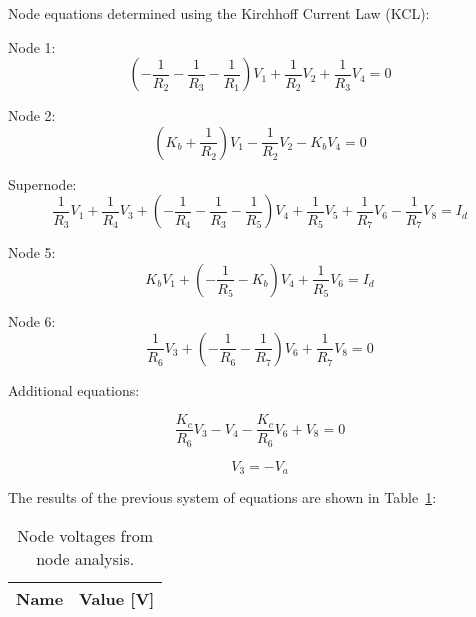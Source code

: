 Node equations determined using the Kirchhoff Current Law (KCL): \vspace{2mm}

Node 1:
\begin{equation}
  (-\frac{1}{R_2}-\frac{1}{R_3}-\frac{1}{R_1})V_1 + \frac{1}{R_2}V_2 + \frac{1}{R_3}V_4 = 0
  \label{eq:node1}
\end{equation}

Node 2:
\begin{equation}
  (K_b+\frac{1}{R_2})V_1 - \frac{1}{R_2}V_2 - K_bV_4 = 0
  \label{eq:node2}
\end{equation}

Supernode:
\begin{equation}
  \frac{1}{R_3}V_1 + \frac{1}{R_4}V_3 + (-\frac{1}{R_4}-\frac{1}{R_3}-\frac{1}{R_5})V_4 + \frac{1}{R_5}V_5 + \frac{1}{R_7}V_6 - \frac{1}{R_7}V_8 = I_d
  \label{eq:node4}
\end{equation}

Node 5:
\begin{equation}
  K_bV_1 + (-\frac{1}{R_5}-K_b)V_4 + \frac{1}{R_5}V_6 = I_d
  \label{eq:node5}
\end{equation}

Node 6:
\begin{equation}
  \frac{1}{R_6}V_3 + (-\frac{1}{R_6}-\frac{1}{R_7})V_6 + \frac{1}{R_7}V_8 = 0
  \label{eq:node6}
\end{equation}

\vspace{4mm}
Additional equations: \vspace{2mm}

\begin{equation}
  \frac{K_c}{R_6}V_3 - V_4 -\frac{K_c}{R_6}V_6 + V_8 = 0
  \label{eq:node8}
\end{equation}

\begin{equation}
  V_3 = -V_a
  \label{eq:node3}
\end{equation}

The results of the previous system of equations are shown in Table~\ref{tab:nodeV}:
 
\begin{table}[h]
  \centering
  \begin{tabular}{|l|r|}
    \hline    
    {\bf Name} & {\bf Value [V]} \\ \hline
    
  \end{tabular}
  \caption{Node voltages from node analysis.}
  \label{tab:nodeV}
\end{table}

